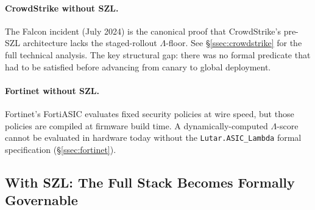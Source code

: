 \paragraph{CrowdStrike without SZL.}
The Falcon incident (July 2024) is the canonical proof that CrowdStrike's
pre-SZL architecture lacks the staged-rollout $\Lambda$-floor.  See
\S\ref{ssec:crowdstrike} for the full technical analysis.  The key structural
gap: there was no formal predicate that had to be satisfied before
advancing from canary to global deployment.

\paragraph{Fortinet without SZL.}
Fortinet's FortiASIC evaluates fixed security policies at wire speed, but
those policies are compiled at firmware build time.  A dynamically-computed
$\Lambda$-score cannot be evaluated in hardware today without the
\texttt{Lutar.ASIC\_Lambda} formal specification (\S\ref{ssec:fortinet}).

\subsection{With SZL: The Full Stack Becomes Formally Governable}
\label{ssec:with-szl-obs-sec}


